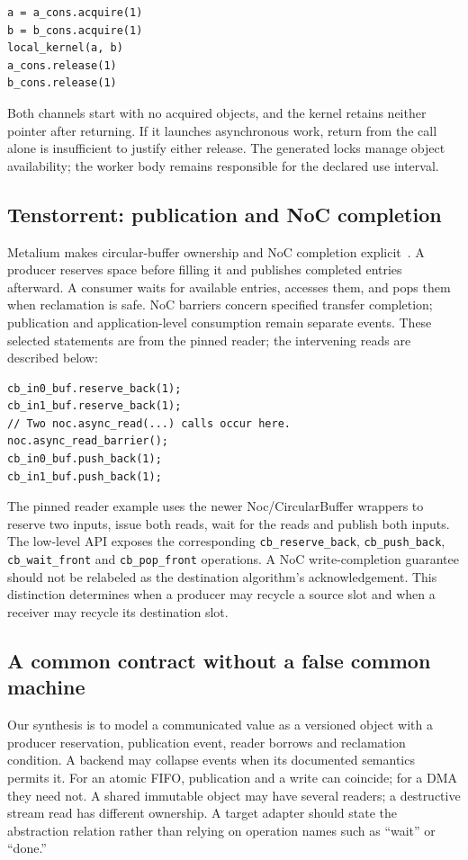 \documentclass[final,3p,times,authoryear]{elsarticle}
\begin{document}
\begin{lstlisting}[float=htbp,caption={A worker-side use of the pinned ObjectFifoHandle API. The named handles and synchronous kernel are supplied by the enclosing program.}]
a = a_cons.acquire(1)
b = b_cons.acquire(1)
local_kernel(a, b)
a_cons.release(1)
b_cons.release(1)
\end{lstlisting}

Both channels start with no acquired objects, and the kernel retains neither pointer after returning. If it launches asynchronous work, return from the call alone is insufficient to justify either release. The generated locks manage object availability; the worker body remains responsible for the declared use interval.

\subsection{Tenstorrent: publication and NoC completion}
Metalium makes circular-buffer ownership and NoC completion explicit~\citep{ttsource2026}. A producer reserves space before filling it and publishes completed entries afterward. A consumer waits for available entries, accesses them, and pops them when reclamation is safe. NoC barriers concern specified transfer completion; publication and application-level consumption remain separate events. These selected statements are from the pinned reader; the intervening reads are described below:

\begin{lstlisting}[float=htbp,caption={Reservation and publication statements from the Metalium reader, with the intervening transfer calls omitted.}]
cb_in0_buf.reserve_back(1);
cb_in1_buf.reserve_back(1);
// Two noc.async_read(...) calls occur here.
noc.async_read_barrier();
cb_in0_buf.push_back(1);
cb_in1_buf.push_back(1);
\end{lstlisting}

The pinned reader example uses the newer Noc/CircularBuffer wrappers to reserve two inputs, issue both reads, wait for the reads and publish both inputs. The low-level API exposes the corresponding \texttt{cb\_reserve\_back}, \texttt{cb\_push\_back}, \texttt{cb\_wait\_front} and \texttt{cb\_pop\_front} operations. A NoC write-completion guarantee should not be relabeled as the destination algorithm's acknowledgement. This distinction determines when a producer may recycle a source slot and when a receiver may recycle its destination slot.

\subsection{A common contract without a false common machine}
Our synthesis is to model a communicated value as a versioned object with a producer reservation, publication event, reader borrows and reclamation condition. A backend may collapse events when its documented semantics permits it. For an atomic FIFO, publication and a write can coincide; for a DMA they need not. A shared immutable object may have several readers; a destructive stream read has different ownership. A target adapter should state the abstraction relation rather than relying on operation names such as ``wait'' or ``done.''
\end{document}
